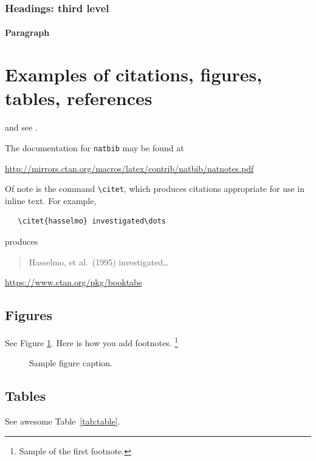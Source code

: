 \documentclass{article}
\begin{document}
\subsubsection{Headings: third level}
\lipsum[6]

\paragraph{Paragraph}
\lipsum[7]

\section{Examples of citations, figures, tables, references}
\label{sec:others}
\lipsum[8] \cite{kour2014real,kour2014fast} and see \cite{hadash2018estimate}.

The documentation for \verb+natbib+ may be found at
\begin{center}
  \url{http://mirrors.ctan.org/macros/latex/contrib/natbib/natnotes.pdf}
\end{center}
Of note is the command \verb+\citet+, which produces citations
appropriate for use in inline text.  For example,
\begin{verbatim}
   \citet{hasselmo} investigated\dots
\end{verbatim}
produces
\begin{quote}
  Hasselmo, et al.\ (1995) investigated\dots
\end{quote}

\begin{center}
  \url{https://www.ctan.org/pkg/booktabs}
\end{center}


\subsection{Figures}
\lipsum[10] 
See Figure \ref{fig:fig1}. Here is how you add footnotes. \footnote{Sample of the first footnote.}
\lipsum[11] 

\begin{figure}
  \centering
  \fbox{\rule[-.5cm]{4cm}{4cm} \rule[-.5cm]{4cm}{0cm}}
  \caption{Sample figure caption.}
  \label{fig:fig1}
\end{figure}

\subsection{Tables}
\lipsum[12]
See awesome Table~\ref{tab:table}.
\end{document}
